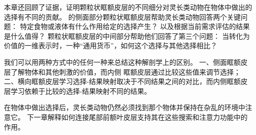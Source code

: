 本章还回顾了证据，证明颗粒状眶额皮层的不同细分对灵长类动物在物体中做出的选择有不同的贡献。
的侧面部分颗粒状眶额皮层帮助灵长类动物回答两个关键问题：
特定食物或液体有什么作用给定的选择产生？
以及根据当前需求评估的结果是什么值得？
颗粒状眶额皮层的中间部分帮助他们回答了第三个问题：
当转化为价值的一维表示时，一种“通用货币”，如何这个选择与其他选择相比？\par


我们可以用两种方式中的任何一种来总结这种解剖学上的区别。 
一、侧面眶额皮层了解物体和其他刺激的价值，而内侧 眶额皮层通过比较这些值来调节选择\cite{noonan2010separate}； 
二、横向眶额皮层学习选择-结果映射取决于不同结果之间的对比，而内侧眶额皮层学习依赖于比较的选择-结果映射不同的结果\cite{rudebeck2011dissociable}。\par


在物体中做出选择后，灵长类动物仍然必须找到那个物体并保持在杂乱的环境中注意它。
下一章解释如何连接尾部前额叶皮层支持其在这些搜索和注意力功能中的作用。\par



